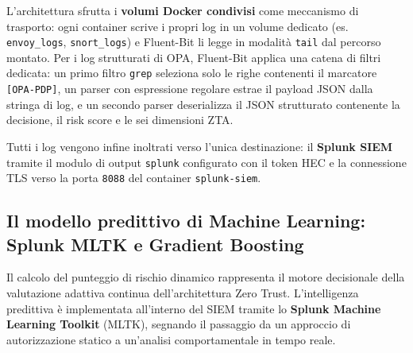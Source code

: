 \begin{table}[htbp]
\centering
\caption{Pipeline di raccolta log di Fluent-Bit: sorgenti e tag associati.}
\label{tab:fluentbit_sources}
\end{table}

L'architettura sfrutta i \textbf{volumi Docker condivisi} come meccanismo di trasporto: ogni container scrive i propri log in un volume dedicato (es. \texttt{envoy\_logs}, \texttt{snort\_logs}) e Fluent-Bit li legge in modalità \texttt{tail} dal percorso montato. Per i log strutturati di OPA, Fluent-Bit applica una catena di filtri dedicata: un primo filtro \texttt{grep} seleziona solo le righe contenenti il marcatore \texttt{[OPA-PDP]}, un parser con espressione regolare estrae il payload JSON dalla stringa di log, e un secondo parser deserializza il JSON strutturato contenente la decisione, il risk score e le sei dimensioni ZTA.

Tutti i log vengono infine inoltrati verso l'unica destinazione: il \textbf{Splunk SIEM} tramite il modulo di output \texttt{splunk} configurato con il token HEC e la connessione TLS verso la porta \texttt{8088} del container \texttt{splunk-siem}.

\subsection{Il modello predittivo di Machine Learning: Splunk MLTK e Gradient Boosting}
Il calcolo del punteggio di rischio dinamico rappresenta il motore decisionale della valutazione adattiva continua dell'architettura Zero Trust. L'intelligenza predittiva è implementata all'interno del SIEM tramite lo \textbf{Splunk Machine Learning Toolkit} (MLTK), segnando il passaggio da un approccio di autorizzazione statico a un'analisi comportamentale in tempo reale.

